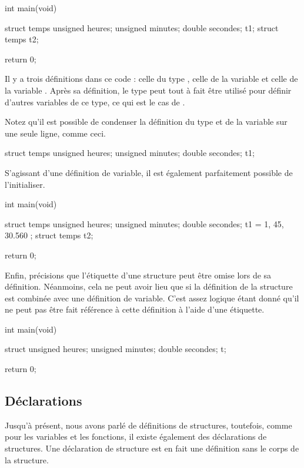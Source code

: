 \begin{C}
int main(void)
{
    struct temps {
        unsigned heures;
        unsigned minutes;
        double secondes;
    } t1;
    struct temps t2;

    return 0;
}
\end{C}

Il y a trois définitions dans ce code : celle du type
 , celle de la variable  et celle de la
variable . Après sa définition, le type
 peut tout à fait être utilisé pour définir
d'autres variables de ce type, ce qui est le cas de .

\begin{infobox}
 Notez qu'il est possible de condenser
la définition du type  et de la variable
 sur une seule ligne, comme ceci.
\begin{C}
 struct temps { unsigned heures; unsigned minutes; double secondes; } t1;
\end{C}
\end{infobox}


S'agissant d'une définition de variable, il est également parfaitement
possible de l'initialiser.

\begin{C}
int main(void)
{
    struct temps {
        unsigned heures;
        unsigned minutes;
        double secondes;
    } t1 = { 1, 45, 30.560 };
    struct temps t2;

    return 0;
}
\end{C}

Enfin, précisions que l'étiquette d'une structure peut être omise lors
de sa définition. Néanmoins, cela ne peut avoir lieu que si la
définition de la structure est combinée avec une définition de variable.
C'est assez logique étant donné qu'il ne peut pas être fait référence à
cette définition à l'aide d'une étiquette.

\begin{C}
int main(void)
{
    struct {
        unsigned heures;
        unsigned minutes;
        double secondes;
    } t;

    return 0;
}
\end{C}

\subsection{Déclarations}
\label{declarations}

Jusqu'à présent, nous avons parlé de définitions de structures,
toutefois, comme pour les variables et les fonctions, il existe
également des déclarations de structures. Une déclaration de structure
est en fait une définition sans le corps de la structure.

